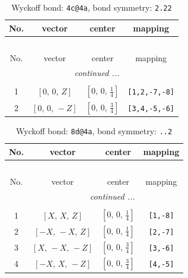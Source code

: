 \documentclass[fleqn,8pt]{jsarticle}
\begin{document}
\renewcommand{\arraystretch}{1.2}
\begin{longtable}{cccc}
\caption{Wyckoff bond: {\tt 4c@4a}, bond symmetry: {\tt 2.22}}
 \\
 \hline \hline
No. & vector & center & mapping \\ \hline \endfirsthead

\multicolumn{3}{l}{\tablename\ \thetable{}} \\
 \hline \hline
No. & vector & center & mapping \\ \hline \endhead

 \hline \hline
\multicolumn{3}{r}{\footnotesize\it continued ...} \\ \endfoot

 \hline \hline
\multicolumn{3}{r}{} \\ \endlastfoot

1 & $\left[ 0,\, 0,\, Z \right]$ & $\left[ 0,\, 0,\, \frac{1}{4} \right]$ & {\tt [1,2,-7,-8]} \\ \hline
2 & $\left[ 0,\, 0,\, - Z \right]$ & $\left[ 0,\, 0,\, \frac{3}{4} \right]$ & {\tt [3,4,-5,-6]} \\
\end{longtable}
\renewcommand{\arraystretch}{1.2}
\begin{longtable}{cccc}
\caption{Wyckoff bond: {\tt 8d@4a}, bond symmetry: {\tt ..2}}
 \\
 \hline \hline
No. & vector & center & mapping \\ \hline \endfirsthead

\multicolumn{3}{l}{\tablename\ \thetable{}} \\
 \hline \hline
No. & vector & center & mapping \\ \hline \endhead

 \hline \hline
\multicolumn{3}{r}{\footnotesize\it continued ...} \\ \endfoot

 \hline \hline
\multicolumn{3}{r}{} \\ \endlastfoot

1 & $\left[ X,\, X,\, Z \right]$ & $\left[ 0,\, 0,\, \frac{1}{4} \right]$ & {\tt [1,-8]} \\ \hline
2 & $\left[ - X,\, - X,\, Z \right]$ & $\left[ 0,\, 0,\, \frac{1}{4} \right]$ & {\tt [2,-7]} \\ \hline
3 & $\left[ X,\, - X,\, - Z \right]$ & $\left[ 0,\, 0,\, \frac{3}{4} \right]$ & {\tt [3,-6]} \\ \hline
4 & $\left[ - X,\, X,\, - Z \right]$ & $\left[ 0,\, 0,\, \frac{3}{4} \right]$ & {\tt [4,-5]} \\
\end{longtable}
\end{document}
